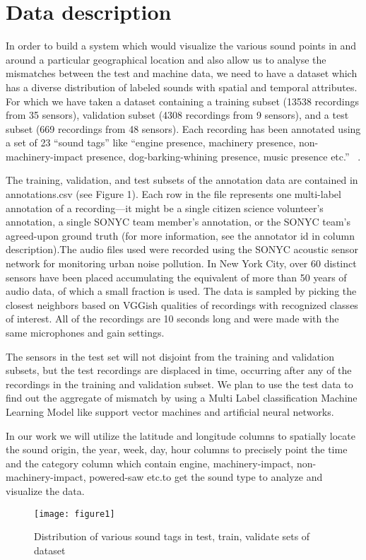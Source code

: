 \section{Data description}
In order to build a system which would visualize the various sound points in and around a particular geographical location and also allow us to analyse the mismatches between the test and machine data, we need to have a dataset which has a diverse distribution of labeled sounds with spatial and temporal attributes. For which we have taken a dataset containing a training subset (13538 recordings from 35 sensors), validation subset (4308 recordings from 9 sensors), and a test subset (669 recordings from 48 sensors). Each recording has been annotated using a set of 23 “sound tags” like “engine presence, machinery presence, non-machinery-impact presence, dog-barking-whining presence, music presence etc.”  ~\cite{4}.

The training, validation, and test subsets of the annotation data are contained in annotations.csv (see Figure 1). Each row in the file represents one multi-label annotation of a recording—it might be a single citizen science volunteer's annotation, a single SONYC team member's annotation, or the SONYC team's agreed-upon ground truth (for more information, see the annotator id in column description).The audio files used were recorded using the SONYC acoustic sensor network for monitoring urban noise pollution. In New York City, over 60 distinct sensors have been placed accumulating the equivalent of more than 50 years of audio data, of which a small fraction is used. The data is sampled by picking the closest neighbors based on VGGish qualities of recordings with recognized classes of interest. All of the recordings are 10 seconds long and were made with the same microphones and gain settings. 

The sensors in the test set will not disjoint from the training and validation subsets, but the test recordings are displaced in time, occurring after any of the recordings in the training and validation subset. We plan to use the test data to find out the aggregate of mismatch by using a Multi Label classification Machine Learning Model like support vector machines and artificial neural networks.

In our work we will utilize the latitude and longitude columns to spatially locate the sound origin, the year, week, day, hour columns to precisely point the time and the category column which contain engine, machinery-impact, non-machinery-impact, powered-saw etc.to get the sound type to analyze and visualize the data.
	\begin{figure}[h!]
		\texttt{[image: figure1]}
		\caption{Distribution of various sound tags in test, train, validate sets of dataset}
	\end{figure}
	


	
	
	
	

	
	